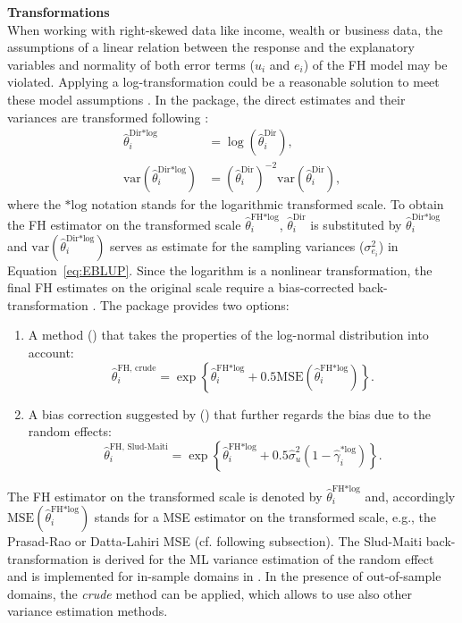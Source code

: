 \textbf{Transformations} \\
When working with right-skewed data like income, wealth or business data, the
assumptions of a linear relation between the response and the explanatory variables
and normality of both error terms ($u_i$ and $e_i$) of the FH model may be violated.
Applying a log-transformation could be a reasonable solution to meet these model
assumptions \citep{Neves2013, Kreutzmann2019}. In the  package, the direct
estimates and their variances are transformed following \citet{Neves2013}:
%
\begin{align*}
\hat{\theta}_{i}^{\text{Dir*log}} &=
\log\left(\hat{\theta}_{i}^{\text{Dir}}\right), \\
\text{var}\left(\hat{\theta}_{i}^{\text{Dir*log}}\right) &=
\left(\hat{\theta}_{i}^{\text{Dir}}\right)^{-2}
\text{var}\left(\hat{\theta}_{i}^{\text{Dir}}\right),
\end{align*}
%
where the $\text{*log}$ notation stands for the logarithmic transformed scale. To
obtain the FH estimator on the transformed scale $\hat{\theta}_i^{\text{FH*log}}$,
$\hat{\theta}_{i}^{\text{Dir}}$ is substituted by $\hat{\theta}_{i}^{\text{Dir*log}}$
and $\text{var}(\hat{\theta}_{i}^{\text{Dir*log}})$ serves as estimate for the sampling
variances ($\sigma_{e_{i}}^2$) in Equation~\ref{eq:EBLUP}. Since the logarithm is
a nonlinear transformation, the final FH estimates on the original scale require
a bias-corrected back-transformation \citep{SludMaiti2006, Sugawasa2017}.
The  package provides two options:
\begin{enumerate}
	\item A  method () that takes the properties of the
	log-normal distribution into account:
	\begin{equation*}
	\hat{\theta}_i^{\text{FH, crude}} = \exp \left\{ \hat{\theta}_i^{\text{FH*log}} +
	0.5 \text{MSE}\left(\hat{\theta}_i^{\text{FH*log}}\right) \right\}.
	\end{equation*}
	
	\item A bias correction suggested by \citet{SludMaiti2006} () that
	further regards the bias due to the random effects:
	\begin{equation*}
	\hat{\theta}^{\text{FH, Slud-Maiti}}_{i} = \exp\left\{ \hat{\theta}^{\text{FH*log}}_{i}
	+ 0.5 \hat{\sigma}_{u}^{2} \left(1 - \hat{\gamma}_{i}^{\text{*log}}\right)\right\}.
	\end{equation*}
\end{enumerate}
The FH estimator on the transformed scale is denoted by
$\hat{\theta}_i^{\text{FH*log}}$ and, accordingly
$\text{MSE}(\hat{\theta}_i^{\text{FH*log}})$ stands for a MSE estimator on the
transformed scale, e.g., the Prasad-Rao or Datta-Lahiri MSE
(cf. following subsection). The Slud-Maiti back-transformation is derived
for the ML variance estimation of the random effect and is implemented for in-sample domains in . In the
presence of out-of-sample domains, the \textsl{crude}
method can be applied, which allows to use also other variance estimation methods.

